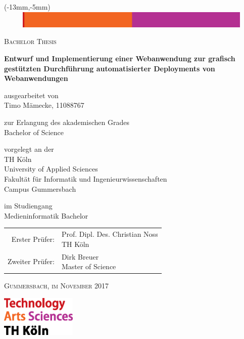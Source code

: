 \begin{titlepage}
  \enlargethispage{5cm}

  \begin{textblock*}{230mm}(-13mm,-5mm)
    \includegraphics[width=230mm,height=8mm]{./assets/topline.eps}
  \end{textblock*}


  \begin{center}
    \textsc{\Large{Bachelor Thesis}}

    \vspace{0.6cm}

    \LARGE{\textbf{Entwurf und Implementierung einer Webanwendung zur grafisch gestützten Durchführung automatisierter Deployments von Webanwendungen}}

    \vspace{0.6cm}

    \normalsize{ausgearbeitet von} \\
    \Large{Timo Mämecke, 11088767}

    \normalsize{zur Erlangung des akademischen Grades} \\
    \Large{Bachelor of Science}

    \normalsize{vorgelegt an der} \\
    \Large{TH Köln}\\
    \Large{University of Applied Sciences}\\
    \Large{Fakultät für Informatik und Ingenieurwissenschaften}\\
    \Large{Campus Gummersbach}

    \normalsize{im Studiengang} \\
    \Large{Medieninformatik Bachelor}

    \vspace{0.6cm}

    \large{
      \begin{tabular}{ r l }
        Erster Prüfer: & \makecell[lt]{Prof. Dipl. Des. Christian Noss\\\small{TH Köln}\vspace{0.2cm}} \\
        Zweiter Prüfer: & \makecell[lt]{Dirk Breuer\\\small{Master of Science}}
      \end{tabular}
    }

    \vspace{0.6cm}

    \textsc{Gummersbach, im November 2017}

  \end{center}

  \begin{flushright}
    \includegraphics[height=55pt]{./assets/logo_th-koeln.eps}
  \end{flushright}
\end{titlepage}
